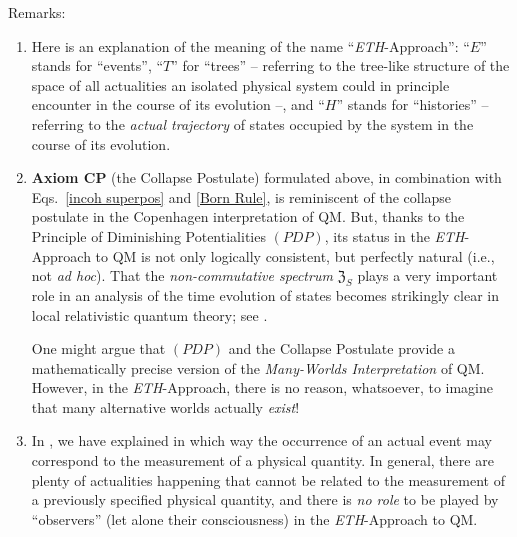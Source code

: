 \documentclass[12pt]{article}
\begin{document}
{Remarks}:
\begin{enumerate}
\item{Here is an explanation of the meaning of the name ``\textit{ETH}-Approach'': ``$E$'' stands for ``events'',
``$T$'' for ``trees'' -- referring to the tree-like structure of the space of all actualities an isolated physical system
could in principle encounter in the course of its evolution --, and ``$H$'' stands for ``histories'' --
referring to the \textit{actual trajectory} of states occupied by the system in the course of its evolution.}
\item{{\bf{Axiom CP}} (the Collapse Postulate) formulated above, in combination with Eqs.~\eqref{incoh superpos}
and \eqref{Born Rule}, is reminiscent of the collapse postulate in the Copenhagen interpretation of QM. But, thanks to the
Principle of Diminishing Potentialities $(PDP)$, its status in the \textit{ETH}-Approach to QM is not only logically consistent, but perfectly natural (i.e., not \textit{ad hoc}). That the \textit{non-commutative spectrum} $\mathfrak{Z}_S$ plays a very important role in an analysis of the time evolution of states becomes strikingly clear in local relativistic quantum theory; see \cite{Fr2}.

One might argue that  $(PDP)$ and the Collapse Postulate provide a mathematically precise version of the
\textit{Many-Worlds Interpretation} of QM. However, in the \textit{ETH}-Approach, there is no reason, whatsoever, to
imagine that many alternative worlds actually \textit{exist}!}
\item{In \cite{Fr1, Fr2}, we have explained in which way the occurrence of an actual event may correspond
to the measurement of a physical quantity. In general, there are plenty of actualities happening that cannot be related
to the measurement of a previously specified physical quantity, and there is \textit{no role} to be played by ``observers'' (let alone their consciousness) in the
\textit{ETH}-Approach to QM.

}
\end{enumerate}
\end{document}
